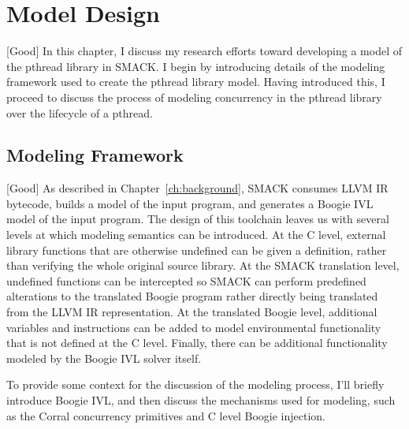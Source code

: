 \chapter{Model Design}\label{ch:modeldesign}
[Good]
In this chapter, I discuss my research efforts toward developing a
model of the pthread library in SMACK.  I begin by introducing details
of the modeling framework used to create the pthread library model.
Having introduced this, I proceed to discuss the process of modeling
concurrency in the pthread library over the lifecycle of a pthread.

\section{Modeling Framework}
[Good]
As described in Chapter~\ref{ch:background}, SMACK consumes LLVM IR
bytecode, builds a model of the input program, and generates a Boogie
IVL model of the input program.  The design of this toolchain leaves
us with several levels at which modeling semantics can be introduced.
At the C level, external library functions that are otherwise
undefined can be given a definition, rather than verifying the whole
original source library. At the SMACK translation level, undefined
functions can be intercepted so SMACK can perform predefined
alterations to the translated Boogie program rather directly being
translated from the LLVM IR representation.  At the translated Boogie
level, additional variables and instructions can be added to model
environmental functionality that is not defined at the C level.
Finally, there can be additional functionality modeled by the Boogie
IVL solver itself. 

To provide some context for the discussion of the modeling process,
I'll briefly introduce Boogie IVL, and then discuss the mechanisms
used for modeling, such as the Corral concurrency primitives and C
level Boogie injection.

